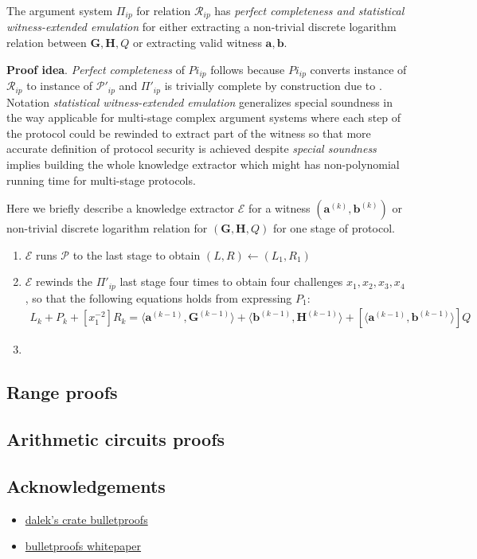 \documentclass[../lecture-notes-148x210.tex]{subfiles}
\begin{document}
\begin{theorem}
    The argument system $\Pi_{ip}$ for relation $\mathcal{R}_{ip}$ has \textit{perfect completeness and statistical witness-extended emulation} for either extracting a non-trivial discrete logarithm relation between $\mathbf{G,H}, Q$ or extracting valid witness $\mathbf{a,b}$.
\end{theorem}

\textbf{Proof idea}. \textit{Perfect completeness} of $Pi_{ip}$ follows because $Pi_{ip}$ converts instance of $\mathcal{R}_{ip}$ to instance of $\mathcal{P}'_{ip}$ and $\Pi'_{ip}$ is trivially complete by construction due to . Notation \textit{statistical witness-extended emulation} generalizes special soundness in the way applicable for multi-stage complex argument systems where each step of the protocol could be rewinded to extract part of the witness so that more accurate definition of protocol security is achieved despite \textit{special soundness} implies building the whole knowledge extractor which might has non-polynomial running time for multi-stage protocols.

Here we briefly describe a knowledge extractor $\mathcal{E}$ for a witness $(\mathbf{a}^{(k)}, \mathbf{b}^{(k)})$ or non-trivial discrete logarithm relation for $(\mathbf{G, H}, Q)$ for one stage of protocol. 
\begin{enumerate}
    \item $\mathcal{E}$ runs $\mathcal{P}$ to the last stage to obtain $(L, R) \gets (L_1, R_1)$
    \item $\mathcal{E}$ rewinds the $\Pi'_{ip}$ last stage four times to obtain four challenges $x_1, x_2, x_3, x_4$, so that the following equations holds from expressing $P_{1}$:
    \begin{align}
        [x_1^2] L_k + P_k + [x_1^{-2}] R_k = \langle \mathbf{a}^{(k-1)}, \mathbf{G}^{(k-1)} \rangle + \langle \mathbf{b}^{(k-1)}, \mathbf{H}^{(k-1)} \rangle + [\langle \mathbf{a}^{(k-1)}, \mathbf{b}^{(k-1)} \rangle]Q
    \end{align}
    \item 
\end{enumerate}
\subsection{Range proofs}

\subsection{Arithmetic circuits proofs}



\subsection*{Acknowledgements}

\begin{itemize}
    \item \href{https://doc-internal.dalek.rs/bulletproofs/index.html}{dalek's crate bulletproofs}
    \item \href{https://eprint.iacr.org/2017/1066.pdf}{bulletproofs whitepaper}
\end{itemize}
\end{document}
